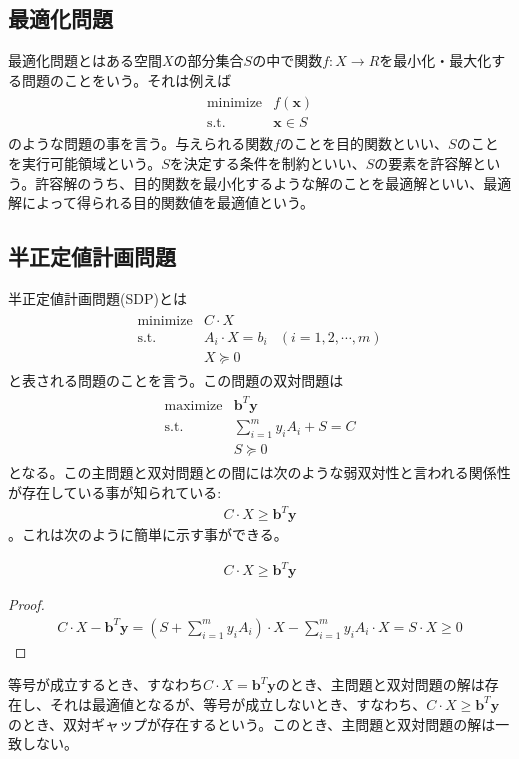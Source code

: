 \subsection{最適化問題}
最適化問題とはある空間$X$の部分集合$S$の中で関数$f: X \rightarrow R$を最小化・最大化する問題のことをいう。それは例えば
\begin{align*}
  \begin{array}{ll}
    \text{minimize} & f(\mathbf{x}) \\
    \text{s.t.}     & \mathbf{x} \in S
  \end{array}
\end{align*}
のような問題の事を言う。与えられる関数$f$のことを目的関数といい、$S$のことを実行可能領域という。$S$を決定する条件を制約といい、$S$の要素を許容解という。許容解のうち、目的関数を最小化するような解のことを最適解といい、最適解によって得られる目的関数値を最適値という。

\subsection{半正定値計画問題}
半正定値計画問題(SDP)とは
\begin{align*}
  \begin{array}{lll}
    \mathrm{minimize} & C \cdot X \\
    \mathrm{s.t.}     & A_i \cdot X = b_i & (i = 1, 2, \cdots, m) \\
                      & X \succeq 0
  \end{array}
\end{align*}
と表される問題のことを言う。この問題の双対問題は
\begin{align*}
  \begin{array}{lll}
    \mathrm{maximize} & \mathbf{b}^T \mathbf{y} \\
    \mathrm{s.t.}     & \displaystyle{\sum_{i = 1}^m} y_i A_i + S = C \\
                      & S \succeq 0
  \end{array}
\end{align*}
となる。この主問題と双対問題との間には次のような弱双対性と言われる関係性が存在している事が知られている:
\begin{align*}
  C \cdot X \geq \mathbf{b}^T \mathbf{y}
\end{align*}
。これは次のように簡単に示す事ができる。
\begin{theorem*}
  \begin{align*}
    C \cdot X \geq \mathbf{b}^T \mathbf{y}
  \end{align*}
\end{theorem*}
\begin{proof}
  \begin{align*}
    C \cdot X - \mathbf{b}^T \mathbf{y} = (S + \displaystyle{\sum_{i = 1}^m} y_i A_i) \cdot X - \displaystyle{\sum_{i = 1}^m} y_i A_i \cdot X = S \cdot X \geq 0
  \end{align*}
\end{proof}
等号が成立するとき、すなわち$C \cdot X = \mathbf{b}^T \mathbf{y}$のとき、主問題と双対問題の解は存在し、それは最適値となるが、等号が成立しないとき、すなわち、$C \cdot X \geq \mathbf{b}^T \mathbf{y}$のとき、双対ギャップが存在するという。このとき、主問題と双対問題の解は一致しない。

